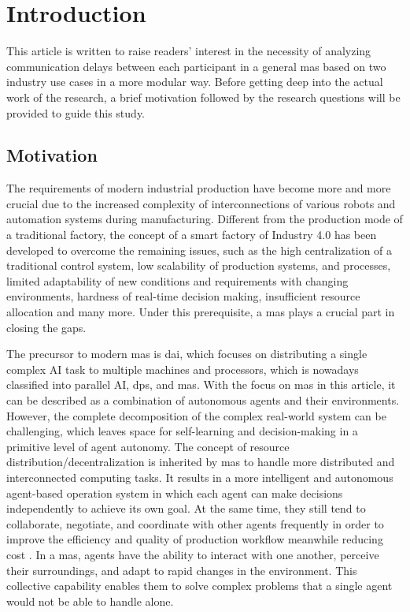 \glsresetall%
\chapter{Introduction}%
This article is written to raise readers' interest in the necessity of 
analyzing communication delays between each participant in a general 
\gls{mas} based on two industry use cases in a more modular way. 
Before getting deep into the actual work of the research, 
a brief motivation followed by the research questions will be
provided to guide this study.

\section{Motivation}
The requirements of modern industrial production have become more and 
more crucial due to the increased complexity of interconnections of 
various robots and automation systems during manufacturing. Different 
from the production mode of a traditional factory, the concept of a 
smart factory of Industry 4.0 has been developed to overcome the 
remaining issues, such as the high centralization of a traditional 
control system, low scalability of production systems, and processes, 
limited adaptability of new conditions and requirements with changing 
environments, hardness of real-time decision making, insufficient resource 
allocation and many more. Under this prerequisite, a \gls{mas} plays a crucial 
part in closing the gaps. 


The precursor to modern \gls{mas} is \gls{dai}, which focuses on distributing a 
single complex AI task to multiple machines and processors\cite{noauthor_jacques_nodate}, 
which is nowadays classified into parallel AI, \gls{dps}, and \gls{mas}\cite{dorri_multi-agent_2018}. 
With the focus on \gls{mas} in this article, it can be described as a combination of 
autonomous agents and their environments. However, the complete decomposition of 
the complex real-world system can be challenging, which leaves space for self-learning 
and decision-making in a primitive level of agent autonomy\cite{reis_applications_2004}. 
The concept of resource distribution/decentralization is inherited by \gls{mas} to 
handle more distributed and interconnected computing tasks. It results in a more 
intelligent and autonomous agent-based operation system in which each agent can make 
decisions independently to achieve its own goal. At the same time, they still tend 
to collaborate, negotiate, and coordinate with other agents frequently in order to 
improve the efficiency and quality of production workflow meanwhile reducing 
cost \cite{vogel-heuser_multi-agent_2020}. In a \gls{mas}, agents have the ability 
to interact with one another, perceive their surroundings, and adapt to rapid changes 
in the environment. This collective capability enables them to solve complex problems 
that a single agent would not be able to handle alone. 

